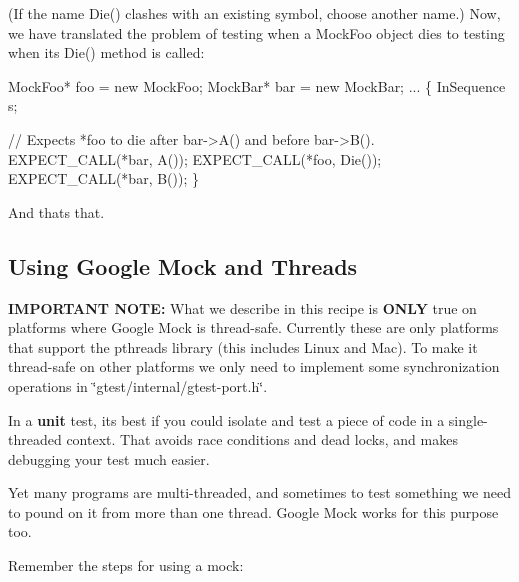 (If the name {\ttfamily Die()} clashes with an existing symbol, choose another name.) Now, we have translated the problem of testing when a {\ttfamily Mock\+Foo} object dies to testing when its {\ttfamily Die()} method is called\+:


\begin{DoxyCode}
MockFoo* foo = new MockFoo;
MockBar* bar = new MockBar;
...
\{
  InSequence s;

  // Expects *foo to die after bar->A() and before bar->B().
  EXPECT\_CALL(*bar, A());
  EXPECT\_CALL(*foo, Die());
  EXPECT\_CALL(*bar, B());
\}
\end{DoxyCode}


And that\textquotesingle{}s that.

\subsection*{Using Google Mock and Threads}

{\bfseries I\+M\+P\+O\+R\+T\+A\+NT N\+O\+TE\+:} What we describe in this recipe is {\bfseries O\+N\+LY} true on platforms where Google Mock is thread-\/safe. Currently these are only platforms that support the pthreads library (this includes Linux and Mac). To make it thread-\/safe on other platforms we only need to implement some synchronization operations in {\ttfamily \char`\"{}gtest/internal/gtest-\/port.\+h\char`\"{}}.

In a {\bfseries unit} test, it\textquotesingle{}s best if you could isolate and test a piece of code in a single-\/threaded context. That avoids race conditions and dead locks, and makes debugging your test much easier.

Yet many programs are multi-\/threaded, and sometimes to test something we need to pound on it from more than one thread. Google Mock works for this purpose too.

Remember the steps for using a mock\+:


